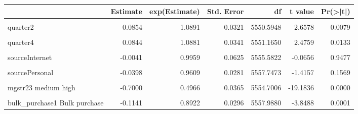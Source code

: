 \documentclass[
  11pt,
]{article}
\begin{document}
\begin{table}[!h]
\centering
\begin{tabular}{l|r|r|r|r|r|r}
\hline
  & Estimate & exp(Estimate) & Std. Error & df & t value & Pr(>|t|)\\
\hline
\cellcolor{gray!6}{(Intercept)} & \cellcolor{gray!6}{-0.6346} & \cellcolor{gray!6}{0.5301} & \cellcolor{gray!6}{0.0393} & \cellcolor{gray!6}{296.1819} & \cellcolor{gray!6}{-16.1290} & \cellcolor{gray!6}{0.0000}\\
\hline
quarter2 & 0.0854 & 1.0891 & 0.0321 & 5550.5948 & 2.6578 & 0.0079\\
\hline
\cellcolor{gray!6}{quarter3} & \cellcolor{gray!6}{0.0841} & \cellcolor{gray!6}{1.0877} & \cellcolor{gray!6}{0.0332} & \cellcolor{gray!6}{5555.0726} & \cellcolor{gray!6}{2.5349} & \cellcolor{gray!6}{0.0113}\\
\hline
quarter4 & 0.0844 & 1.0881 & 0.0341 & 5551.1650 & 2.4759 & 0.0133\\
\hline
\cellcolor{gray!6}{sourceHeard it} & \cellcolor{gray!6}{0.0633} & \cellcolor{gray!6}{1.0653} & \cellcolor{gray!6}{0.0335} & \cellcolor{gray!6}{5556.1197} & \cellcolor{gray!6}{1.8904} & \cellcolor{gray!6}{0.0588}\\
\hline
sourceInternet & -0.0041 & 0.9959 & 0.0625 & 5555.5822 & -0.0656 & 0.9477\\
\hline
\cellcolor{gray!6}{sourceInternet Pharmacy} & \cellcolor{gray!6}{-0.3227} & \cellcolor{gray!6}{0.7242} & \cellcolor{gray!6}{0.1016} & \cellcolor{gray!6}{5548.9347} & \cellcolor{gray!6}{-3.1743} & \cellcolor{gray!6}{0.0015}\\
\hline
sourcePersonal & -0.0398 & 0.9609 & 0.0281 & 5557.7473 & -1.4157 & 0.1569\\
\hline
\cellcolor{gray!6}{mgstr22 medium} & \cellcolor{gray!6}{-0.3816} & \cellcolor{gray!6}{0.6827} & \cellcolor{gray!6}{0.0279} & \cellcolor{gray!6}{5549.1951} & \cellcolor{gray!6}{-13.6631} & \cellcolor{gray!6}{0.0000}\\
\hline
mgstr23 medium high & -0.7000 & 0.4966 & 0.0365 & 5554.7006 & -19.1836 & 0.0000\\
\hline
\cellcolor{gray!6}{mgstr24 high} & \cellcolor{gray!6}{-1.1197} & \cellcolor{gray!6}{0.3264} & \cellcolor{gray!6}{0.0420} & \cellcolor{gray!6}{5559.7107} & \cellcolor{gray!6}{-26.6889} & \cellcolor{gray!6}{0.0000}\\
\hline
bulk\_purchase1 Bulk purchase & -0.1141 & 0.8922 & 0.0296 & 5557.9880 & -3.8488 & 0.0001\\
\hline
\end{tabular}
\end{table}
\end{document}
